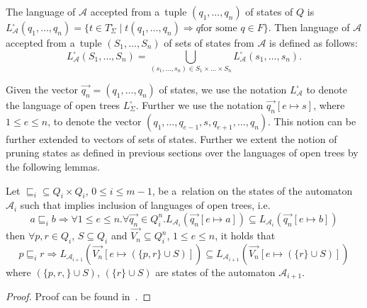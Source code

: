 The language of $\mathcal{A}$ accepted from a~tuple $(q_1,\ldots,q_n)$ of states
of $Q$ is $L^\square_\mathcal{A}(q_1,\ldots,q_n) = \{t \in T^\square_\Sigma
\mid t(q_1,\ldots,q_n) \Longrightarrow q \text{for some } q \in F\}$. Then
language of $\mathcal{A}$ accepted from a~tuple $(S_1,\ldots,S_n)$ of sets of
states from $\mathcal{A}$ is defined as
follows:
\begin{equation}
L_\mathcal{A}^\square(S_1,\ldots,S_n) = \bigcup_{(s_1,\ldots,s_n) \in
S_1\times\ldots\times S_n} L_\mathcal{A}^\square(s_1,\ldots,s_n).
\end{equation}

Given the vector $\overset{\rightarrow}{q_n} = (q_1,\ldots,q_n)$ of states, we
use the notation $L_\mathcal{A}^\square$ to denote the language of open trees
$L_\Sigma^\square$. Further we use the notation $\overset{\rightarrow}{q_n}[e
\mapsto s]$, where $1 \leq e \leq n$, to denote the vector
$(q_1,\ldots,q_{e-1}, s, q_{e+1},\ldots,q_n)$. This notion can be further
extended to vectors of sets of states.
\newpage
Further we extent the notion of pruning states as defined in previous sections
over the languages of open trees by the following lemmas.

\begin{lemma}
Let $\sqsubseteq_i \subseteq Q_i \times Q_i$, $0 \leq i \leq m-1$, be a~relation
on the states of the automaton $\mathcal{A}_i$ such that implies inclusion of
languages of open trees, i.e.
\begin{equation}
 a \sqsubseteq_i b \Rightarrow \forall 1 \leq e \leq n. \forall
 \overset{\rightarrow}{q_n} \in Q_i^n.
 L_{\mathcal{A}_{i}}(\overset{\rightarrow}{q_n}[e \mapsto a]) \subseteq
 L_{\mathcal{A}_{i}}(\overset{\rightarrow}{q_n}[e \mapsto b])
\end{equation}
then $\forall p, r \in Q_i$, $S \subseteq Q_i$ and $\overset{\rightarrow}{V_n}
\subseteq Q^n_i$, $1 \leq e \leq n$, it holds that
\begin{equation}
 p \sqsubseteq_i r \Rightarrow
 L_{\mathcal{A}_{i+1}}(\overset{\rightarrow}{V_n}[e \mapsto (\{p, r\} \cup S)])
 \subseteq  L_{\mathcal{A}_{i+1}}(\overset{\rightarrow}{V_n}[e \mapsto (\{r\}
 \cup S)])
\end{equation}
where $(\{p, r,\} \cup S)$, $(\{r\} \cup S)$ are states of the automaton
$\mathcal{A}_{i+1}$.
\end{lemma}

\begin{proof}
Proof can be found in~\cite{tacas}.
\end{proof}

